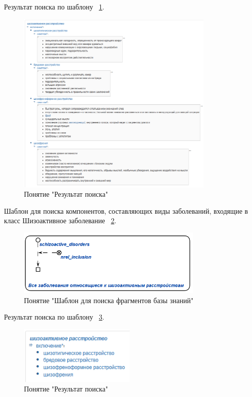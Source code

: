 Результат поиска по шаблону
~\ref{fig:sections/psy_1}.
\begin{figure}[H]
	\centering
	\includegraphics[width=0.85\textwidth]{sections/psy_1.png}
	\caption{Понятие "Результат поиска"}
	\label{fig:sections/psy_1}
\end{figure}

Шаблон для поиска компонентов, составляющих виды заболеваний, входящие в класс Шизоактивное заболевание
~\ref{fig:sections/pattern_2}.
\begin{figure}[H]
	\centering
	\includegraphics[width=0.8\textwidth]{sections/pattern_2.png}
	\caption{Понятие "Шаблон для поиска фрагментов базы знаний"}
	\label{fig:sections/pattern_2}
\end{figure}

Результат поиска по шаблону
~\ref{fig:sections/psy_2}.
\begin{figure}[H]
	\centering
	\includegraphics[width=0.5\textwidth]{sections/psy_2.png}
	\caption{Понятие "Результат поиска"}
	\label{fig:sections/psy_2}
\end{figure}


